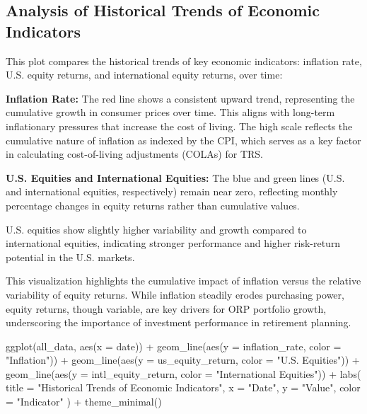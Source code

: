 \documentclass[
  letterpaper,
  DIV=11,
  numbers=noendperiod]{scrartcl}
\newenvironment{Shaded}{\begin{snugshade}}{\end{snugshade}}
\newcommand{\AttributeTok}[1]{\textcolor[rgb]{0.40,0.45,0.13}{#1}}
\newcommand{\FunctionTok}[1]{\textcolor[rgb]{0.28,0.35,0.67}{#1}}
\newcommand{\NormalTok}[1]{\textcolor[rgb]{0.00,0.23,0.31}{#1}}
\newcommand{\SpecialCharTok}[1]{\textcolor[rgb]{0.37,0.37,0.37}{#1}}
\newcommand{\StringTok}[1]{\textcolor[rgb]{0.13,0.47,0.30}{#1}}
\begin{document}
\subsection{Analysis of Historical Trends of Economic
Indicators}\label{analysis-of-historical-trends-of-economic-indicators}

This plot compares the historical trends of key economic indicators:
inflation rate, U.S. equity returns, and international equity returns,
over time:

\textbf{Inflation Rate:} The red line shows a consistent upward trend,
representing the cumulative growth in consumer prices over time. This
aligns with long-term inflationary pressures that increase the cost of
living. The high scale reflects the cumulative nature of inflation as
indexed by the CPI, which serves as a key factor in calculating
cost-of-living adjustments (COLAs) for TRS.

\textbf{U.S. Equities and International Equities:} The blue and green
lines (U.S. and international equities, respectively) remain near zero,
reflecting monthly percentage changes in equity returns rather than
cumulative values.

U.S. equities show slightly higher variability and growth compared to
international equities, indicating stronger performance and higher
risk-return potential in the U.S. markets.

This visualization highlights the cumulative impact of inflation versus
the relative variability of equity returns. While inflation steadily
erodes purchasing power, equity returns, though variable, are key
drivers for ORP portfolio growth, underscoring the importance of
investment performance in retirement planning.

\begin{Shaded}
\begin{Highlighting}[]
\FunctionTok{ggplot}\NormalTok{(all\_data, }\FunctionTok{aes}\NormalTok{(}\AttributeTok{x =}\NormalTok{ date)) }\SpecialCharTok{+}
  \FunctionTok{geom\_line}\NormalTok{(}\FunctionTok{aes}\NormalTok{(}\AttributeTok{y =}\NormalTok{ inflation\_rate, }\AttributeTok{color =} \StringTok{"Inflation"}\NormalTok{)) }\SpecialCharTok{+}
  \FunctionTok{geom\_line}\NormalTok{(}\FunctionTok{aes}\NormalTok{(}\AttributeTok{y =}\NormalTok{ us\_equity\_return, }\AttributeTok{color =} \StringTok{"U.S. Equities"}\NormalTok{)) }\SpecialCharTok{+}
  \FunctionTok{geom\_line}\NormalTok{(}\FunctionTok{aes}\NormalTok{(}\AttributeTok{y =}\NormalTok{ intl\_equity\_return, }\AttributeTok{color =} \StringTok{"International Equities"}\NormalTok{)) }\SpecialCharTok{+}
  \FunctionTok{labs}\NormalTok{(}
    \AttributeTok{title =} \StringTok{"Historical Trends of Economic Indicators"}\NormalTok{,}
    \AttributeTok{x =} \StringTok{"Date"}\NormalTok{,}
    \AttributeTok{y =} \StringTok{"Value"}\NormalTok{,}
    \AttributeTok{color =} \StringTok{"Indicator"}
\NormalTok{  ) }\SpecialCharTok{+}
  \FunctionTok{theme\_minimal}\NormalTok{()}
\end{Highlighting}
\end{Shaded}
\end{document}
